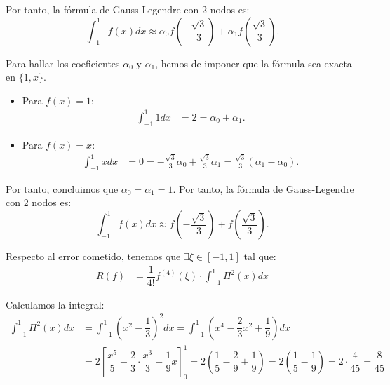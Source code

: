 \begin{ejercicio}
\begin{enumerate}
        Por tanto, la fórmula de Gauss-Legendre con 2 nodos es:
        \begin{equation*}
            \int_{-1}^{1} f(x) dx \approx \alpha_0 f\left(-\frac{\sqrt{3}}{3}\right) + \alpha_1 f\left(\frac{\sqrt{3}}{3}\right).
        \end{equation*}

        Para hallar los coeficientes $\alpha_0$ y $\alpha_1$, hemos de imponer que la fórmula sea exacta en $\{1,x\}$.
        \begin{itemize}
            \item Para $f(x) = 1$:
            \begin{align*}
                \int_{-1}^{1} 1 dx &= 2 = \alpha_0 + \alpha_1.
            \end{align*}
            \item Para $f(x) = x$:
            \begin{align*}
                \int_{-1}^{1} x dx &= 0 = -\frac{\sqrt{3}}{3}\alpha_0 + \frac{\sqrt{3}}{3}\alpha_1
                = \frac{\sqrt{3}}{3}(\alpha_1 - \alpha_0).
            \end{align*}
        \end{itemize}

        Por tanto, concluimos que $\alpha_0 = \alpha_1 = 1$. Por tanto, la fórmula de Gauss-Legendre con 2 nodos es:
        \begin{equation*}
            \int_{-1}^{1} f(x) dx \approx f\left(-\frac{\sqrt{3}}{3}\right) + f\left(\frac{\sqrt{3}}{3}\right).
        \end{equation*}


        Respecto al error cometido, tenemos que $\exists \xi \in [-1, 1]$ tal que:
        \begin{align*}
            R(f) &= \dfrac{1}{4!}f^{(4)}(\xi) \cdot \int_{-1}^{1} \Pi^2(x) dx
        \end{align*}

        Calculamos la integral:
        \begin{align*}
            \int_{-1}^{1} \Pi^2(x) dx &= \int_{-1}^{1} \left(x^2 - \dfrac{1}{3}\right)^2 dx = \int_{-1}^{1} \left(x^4 - \dfrac{2}{3}x^2 + \dfrac{1}{9}\right) dx\\
            &= 2\left[\dfrac{x^5}{5} - \dfrac{2}{3}\cdot \dfrac{x^3}{3} + \dfrac{1}{9}x\right]_{0}^{1} = 2\left(\dfrac{1}{5} - \dfrac{2}{9} + \dfrac{1}{9}\right) = 2\left(\dfrac{1}{5} - \dfrac{1}{9}\right) = 2\cdot \dfrac{4}{45} = \dfrac{8}{45}
        \end{align*}


\end{enumerate}
\end{ejercicio}
